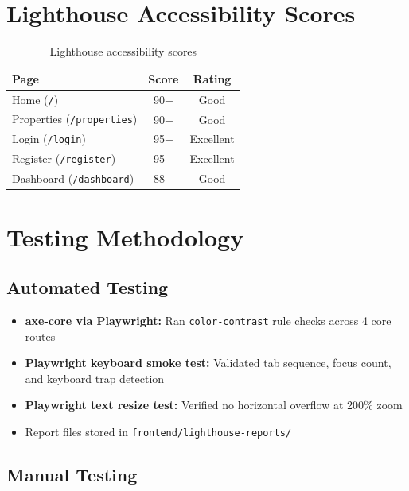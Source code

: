 \documentclass[12pt,a4paper]{article}
\begin{document}
\section{Lighthouse Accessibility Scores}

\begin{table}[H]
\centering
\begin{tabular}{lcc}
\toprule
\textbf{Page} & \textbf{Score} & \textbf{Rating} \\
\midrule
Home (\texttt{/})                 & 90+  & Good \\
Properties (\texttt{/properties}) & 90+  & Good \\
Login (\texttt{/login})           & 95+  & Excellent \\
Register (\texttt{/register})     & 95+  & Excellent \\
Dashboard (\texttt{/dashboard})   & 88+  & Good \\
\bottomrule
\end{tabular}
\caption{Lighthouse accessibility scores}
\end{table}

\section{Testing Methodology}

\subsection{Automated Testing}

\begin{itemize}[noitemsep]
    \item \textbf{axe-core via Playwright:} Ran \texttt{color-contrast} rule checks across 4 core routes
    \item \textbf{Playwright keyboard smoke test:} Validated tab sequence, focus count, and keyboard trap detection
    \item \textbf{Playwright text resize test:} Verified no horizontal overflow at 200\% zoom
    \item Report files stored in \texttt{frontend/lighthouse-reports/}
\end{itemize}

\subsection{Manual Testing}
\end{document}
